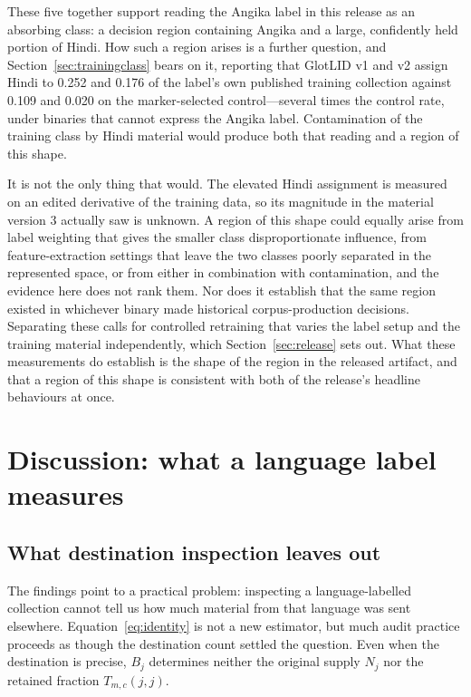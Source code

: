 \documentclass[final]{clv2025}
\begin{document}
These five together support reading the Angika label in this release as an absorbing class: a decision region containing Angika and a large, confidently held portion of Hindi. How such a region arises is a further question, and Section~\ref{sec:trainingclass} bears on it, reporting that GlotLID v1 and v2 assign Hindi to 0.252 and 0.176 of the label's own published training collection against 0.109 and 0.020 on the marker-selected control---several times the control rate, under binaries that cannot express the Angika label. Contamination of the training class by Hindi material would produce both that reading and a region of this shape.

It is not the only thing that would. The elevated Hindi assignment is measured on an edited derivative of the training data, so its magnitude in the material version 3 actually saw is unknown. A region of this shape could equally arise from label weighting that gives the smaller class disproportionate influence, from feature-extraction settings that leave the two classes poorly separated in the represented space, or from either in combination with contamination, and the evidence here does not rank them. Nor does it establish that the same region existed in whichever binary made historical corpus-production decisions. Separating these calls for controlled retraining that varies the label setup and the training material independently, which Section~\ref{sec:release} sets out. What these measurements do establish is the shape of the region in the released artifact, and that a region of this shape is consistent with both of the release's headline behaviours at once.

\section{Discussion: what a language label measures}

\subsection{What destination inspection leaves out}

The findings point to a practical problem: inspecting a language-labelled collection cannot tell us how much material from that language was sent elsewhere. Equation~\ref{eq:identity} is not a new estimator, but much audit practice proceeds as though the destination count settled the question. Even when the destination is precise, $B_j$ determines neither the original supply $N_j$ nor the retained fraction $T_{m,c}(j,j)$.
\end{document}

